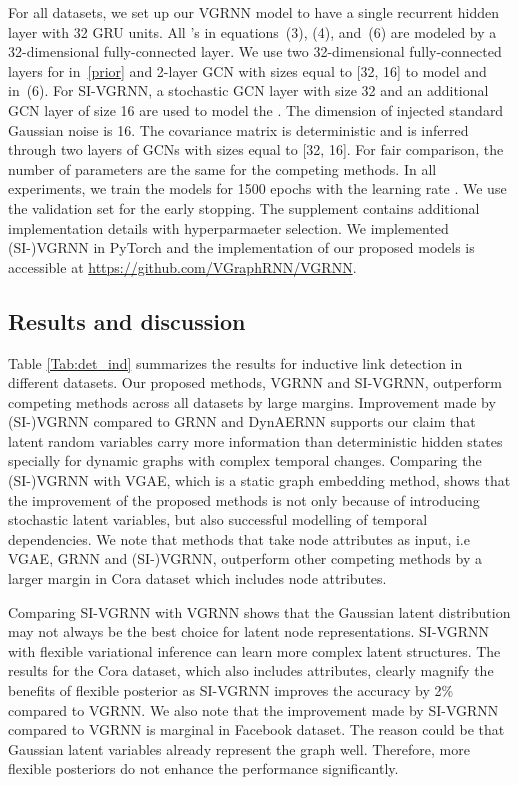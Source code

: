 \documentclass{article}
\begin{document}
For all datasets, we set up our VGRNN model to have a single recurrent hidden layer with 32 GRU units. All 's in equations~(3), (4), and~(6) are modeled by a 32-dimensional fully-connected layer. We use two 32-dimensional fully-connected layers for  in~\eqref{prior} and 2-layer GCN with sizes equal to [32, 16] to model  and  in~(6). 
For SI-VGRNN, a stochastic GCN layer with size 32 and an additional GCN layer of size 16 are used to model the . 
The dimension of injected standard Gaussian noise  is 16. The covariance matrix  is deterministic and is inferred through two layers of GCNs with sizes equal to [32, 16].
For fair comparison, the number of parameters are the same for the competing methods. In all experiments, we train the models for 1500 epochs with the learning rate . We use the validation set for the early stopping. The supplement contains additional implementation details with hyperparmaeter selection. We implemented (SI-)VGRNN in PyTorch \citep{paszke2017automatic} and the implementation of our proposed models is accessible at \url{https://github.com/VGraphRNN/VGRNN}.


\subsection{Results and discussion}
\quad  Table \ref{Tab:det_ind} summarizes the results for inductive link detection in different datasets. Our proposed methods, VGRNN and SI-VGRNN, outperform competing methods across all datasets by large margins. 
Improvement made by (SI-)VGRNN compared to GRNN and DynAERNN supports our claim that latent random variables carry more information than deterministic hidden states specially for dynamic graphs with complex temporal changes. 
Comparing the (SI-)VGRNN with VGAE, which is a static graph embedding method, shows that the improvement of the proposed methods is not only because of introducing stochastic latent variables, but also successful modelling of temporal dependencies. 
We note that methods that take node attributes as input, i.e VGAE, GRNN and (SI-)VGRNN, outperform other competing methods by a larger margin in Cora dataset which includes node attributes.

Comparing SI-VGRNN with VGRNN shows that the Gaussian latent distribution may not always be the best choice for latent node representations. 
SI-VGRNN with flexible variational inference can learn more complex latent structures.
The results for the Cora dataset, which also includes attributes, clearly magnify the benefits of flexible posterior as SI-VGRNN improves the accuracy by 2\% compared to VGRNN.
We also note that the improvement made by SI-VGRNN compared to VGRNN is marginal in Facebook dataset. The reason could be that Gaussian latent variables already represent the graph well. Therefore, more flexible posteriors do not enhance the performance significantly.
\end{document}

